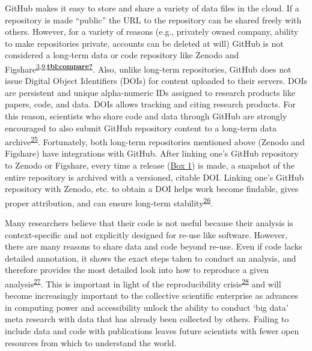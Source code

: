 GitHub makes it easy to store and share a variety of data files in the cloud.
If a repository is made ``public'' the URL to the repository can be shared freely with others.
However, for a variety of reasons (e.g., privately owned company, ability to make repositories private, accounts can be deleted at will) GitHub is not considered a long-term data or code repository like Zenodo and Figshare\textsuperscript{\protect\hyperlink{ref-10ghgV3S8}{3},\protect\hyperlink{ref-kEX5dgzK}{9},\protect\hyperlink{ref-tbl:compare}{\textbf{tbl:compare?}}}.
Also, unlike long-term repositories, GitHub does not issue Digital Object Identifiers (DOIs) for content uploaded to their servers.
DOIs are persistent and unique alpha-numeric IDs assigned to research products like papers, code, and data.
DOIs allows tracking and citing research products.
For this reason, scientists who share code and data through GitHub are strongly encouraged to also submit GitHub repository content to a long-term data archive\textsuperscript{\protect\hyperlink{ref-1Du6fzB8g}{25}}.
Fortunately, both long-term repositories mentioned above (Zenodo and Figshare) have integrations with GitHub.
After linking one's GitHub repository to Zenodo or Figshare, every time a release (\protect\hyperlink{definitions}{Box 1}) is made, a snapshot of the entire repository is archived with a versioned, citable DOI.
Linking one's GitHub repository with Zenodo, etc. to obtain a DOI helps work become findable, gives proper attribution, and can ensure long-term stability\textsuperscript{\protect\hyperlink{ref-iIEKCTLU}{26}}.

Many researchers believe that their code is not useful because their analysis is context-specific and not explicitly designed for re-use like software.
However, there are many reasons to share data and code beyond re-use.
Even if code lacks detailed annotation, it shows the exact steps taken to conduct an analysis, and therefore provides the most detailed look into how to reproduce a given analysis\textsuperscript{\protect\hyperlink{ref-uBJwnPbq}{27}}.
This is important in light of the reproducibility crisis\textsuperscript{\protect\hyperlink{ref-1HZdsK5Kn}{28}} and will become increasingly important to the collective scientific enterprise as advances in computing power and accessibility unlock the ability to conduct `big data' meta research with data that has already been collected by others.
Failing to include data and code with publications leaves future scientists with fewer open resources from which to understand the world.

